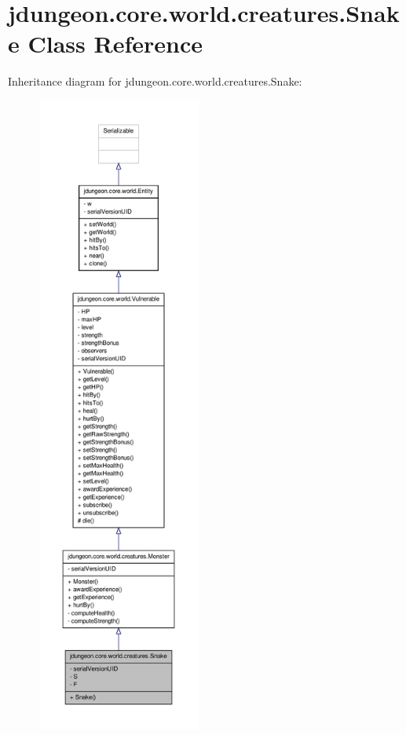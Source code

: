 \hypertarget{classjdungeon_1_1core_1_1world_1_1creatures_1_1_snake}{
\section{jdungeon.core.world.creatures.Snake Class Reference}
\label{classjdungeon_1_1core_1_1world_1_1creatures_1_1_snake}
}


Inheritance diagram for jdungeon.core.world.creatures.Snake:
\nopagebreak
\begin{figure}[H]
\begin{center}
\leavevmode
\includegraphics[height=600pt]{classjdungeon_1_1core_1_1world_1_1creatures_1_1_snake__inherit__graph}
\end{center}
\end{figure}


